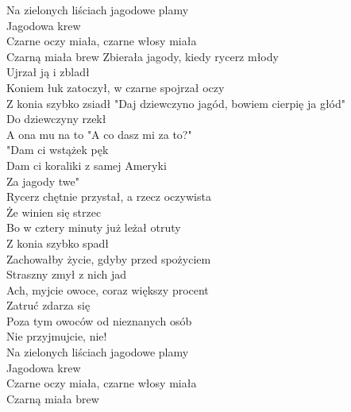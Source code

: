 \begin{flushleft}
Na zielonych liściach jagodowe plamy \\
Jagodowa krew\tab{}\tab{}\\
Czarne oczy miała, czarne włosy miała \\
Czarną miała brew\tab{}
\vskip 3mm
Zbierała jagody, kiedy rycerz młody \\
Ujrzał ją i zbladł \tab{}\\
Koniem łuk zatoczył, w czarne spojrzał oczy\\
Z konia szybko zsiadł \tab{}
\vskip 3mm
"Daj dziewczyno jagód, bowiem cierpię ja głód" \\
Do dziewczyny rzekł \tab{}\tab{}\\
A ona mu na to "A co dasz mi za to?"\tab{}\\
"Dam ci wstążek pęk\tab{}\tab{}\\
\vskip 3mm
Dam ci koraliki z samej Ameryki\\
Za jagody twe"\tab{}\tab{}\\
Rycerz chętnie przystał, a rzecz oczywista\\
Że winien się strzec\tab{}\\
\vskip 3mm
Bo w cztery minuty już leżał otruty \\
Z konia szybko spadł \tab{}\\
Zachowałby życie, gdyby przed spożyciem\\
Straszny zmył z nich jad \tab{}\\
\vskip 3mm
Ach, myjcie owoce, coraz większy procent \\
Zatruć zdarza się \tab{}\\
Poza tym owoców od nieznanych osób\\
Nie przyjmujcie, nie! \tab{}\\
\vskip 3mm
Na zielonych liściach jagodowe plamy \\
Jagodowa krew \tab{}\\
Czarne oczy miała, czarne włosy miała\\
Czarną miała brew \tab{}
\end{flushleft}
\newpage